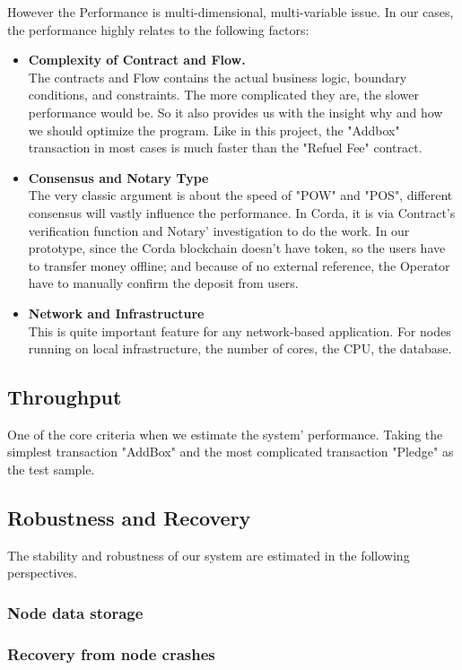 However the Performance is multi-dimensional, multi-variable issue. In our cases, the performance highly relates to the following factors:
\begin{itemize}
	\item \textbf{Complexity of Contract and Flow.}\\
		The contracts and Flow contains the actual business logic, boundary conditions, and constraints. The more complicated they are, the slower performance would be. So it also provides us with the insight why and how we should optimize the program. Like in this project, the "Addbox" transaction in most cases is much faster than the "Refuel Fee" contract.
    \item \textbf{Consensus and Notary Type}\\
        The very classic argument is about the speed of "POW" and "POS", different consensus will vastly influence the performance. In Corda, it is via Contract's verification function and Notary' investigation to do the work.
        In our prototype, since the Corda blockchain doesn't have token, so the users have to transfer money offline; and because of no external reference, the Operator have to manually confirm the deposit from users.
    \item \textbf{Network and Infrastructure}\\
		This is quite important feature for any network-based application. For nodes running on local infrastructure, the number of cores, the CPU, the database.
\end{itemize}
\subsection{Throughput}
One of the core criteria when we estimate the system' performance. Taking the simplest transaction "AddBox" and the most complicated transaction "Pledge" as the test sample.

\subsection{Robustness and Recovery}
The stability and robustness of our system are estimated in the following perspectives.
\subsubsection{Node data storage}

\subsubsection{Recovery from node crashes}


